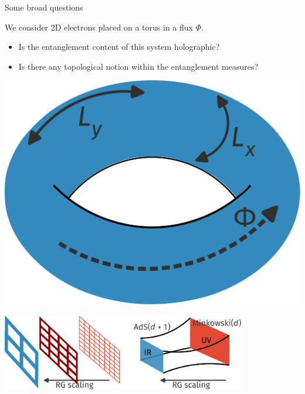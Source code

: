 \documentclass[aspectratio=169]{beamer}
\begin{document}
\begin{frame}{Some broad questions}
\begin{minipage}{0.65\textwidth}
We consider 2D electrons placed on a torus in a flux \(\Phi\).
\begin{itemize}
	\item Is the entanglement content of this system \alert{holographic}?\\[10pt]
	\item Is there any \alert{topological} notion within the entanglement measures?
\end{itemize}
\end{minipage}
\hspace*{\fill}
\begin{minipage}{0.3\textwidth}
	\includegraphics[width=\textwidth]{torus.pdf}
\end{minipage}

\vspace*{\fill}
\includegraphics[width=0.8\textwidth]{holography.pdf}
\end{frame}
\end{document}
